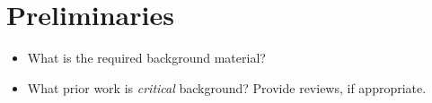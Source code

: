 \section{Preliminaries}\label{sec:prelims}

\begin{itemize}
  \item What is the required background material?
  \item What prior work is \emph{critical} background?
    Provide reviews, if appropriate.
\end{itemize}
